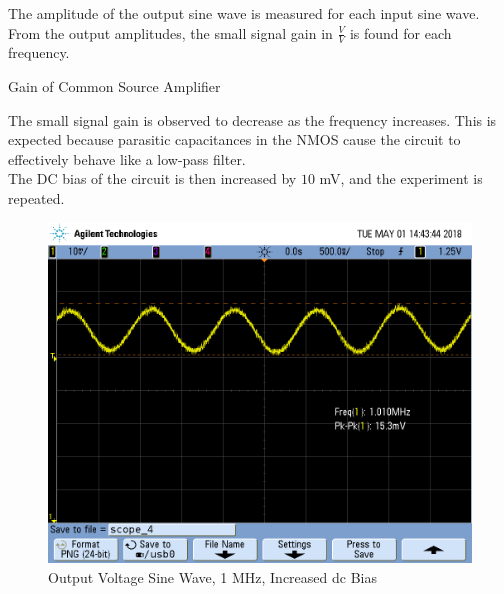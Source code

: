 \FloatBarrier

The amplitude of the output sine wave is measured for each input sine wave. 
From the output amplitudes, the small signal gain in $\frac{V}{V}$ is found for each frequency.

\FloatBarrier

\begin{table}[h!]
	\centering
	\caption{Gain of Common Source Amplifier}
	\label{tab:gain_part2}
\end{table}

\FloatBarrier

The small signal gain is observed to decrease as the frequency increases.
This is expected because parasitic capacitances in the NMOS cause the circuit to effectively behave like a low-pass filter. \\

The DC bias of the circuit is then increased by $10$ \si{\milli\volt}, and the experiment is repeated.

\FloatBarrier

\begin{figure}[h!]
	\centering
	\includegraphics[scale=0.3]{./images/SCOPE_4.PNG}
	\caption{Output Voltage Sine Wave, 1 \si{\mega\hertz}, Increased dc Bias}
	\label{fig:1mhz_original}
\end{figure}

\FloatBarrier

